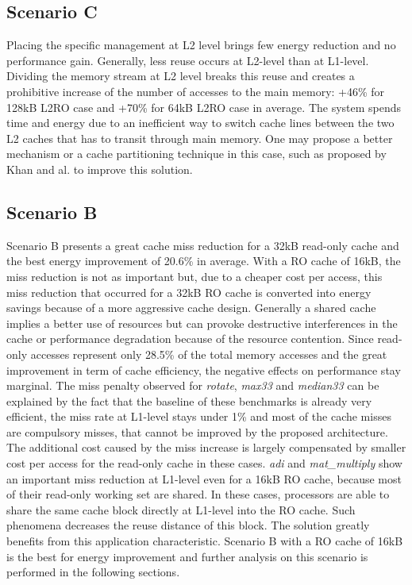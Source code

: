 \documentclass[sigconf]{acmart}
\begin{document}
\subsection{Scenario C}

Placing the specific management at L2 level brings few energy reduction and no performance gain. Generally, less reuse occurs at L2-level than at L1-level. Dividing the memory stream at L2 level breaks this reuse and creates a prohibitive increase of the number of accesses to the main memory: +46\% for 128kB L2RO case and +70\% for 64kB L2RO case in average. The system spends time and energy due to an inefficient way to switch cache lines between the two L2 caches that has to transit through main memory. One may propose a better mechanism or a cache partitioning technique in this case, such as proposed by Khan and al.\cite{Khan:2014} to improve this solution. 

\subsection{Scenario B}

Scenario B presents a great cache miss reduction for a 32kB read-only
cache and the best energy improvement of 20.6\% in average. With a RO
cache of 16kB, the miss reduction is not as important but, due to a
cheaper cost per access, this miss reduction that occurred for a 32kB
RO cache is converted into energy savings because of a more aggressive
cache design.
Generally a shared cache implies a better use of resources but
can provoke destructive interferences in the cache or performance
degradation because of the resource contention. Since read-only
accesses represent only 28.5\% of the total memory accesses and the
great improvement in term of cache efficiency, the negative effects on
performance stay marginal. The miss penalty observed for \textit{rotate},
\textit{max33} and \textit{median33} can be explained by the fact that
the baseline of these benchmarks is already very efficient, the miss
rate at L1-level stays under 1\% and most of the cache misses
are compulsory misses, that cannot be improved by the proposed architecture. The additional cost caused by the miss increase is
largely compensated by smaller cost per access for the read-only cache
in these cases. \textit{adi} and \textit{mat\_multiply} show an
important miss reduction at L1-level even for a 16kB RO cache, because
most of their read-only working set are shared. In these cases,
processors are able to share the same cache block directly at L1-level
into the RO cache. Such phenomena decreases the reuse distance of this
block. The solution greatly benefits from this
application characteristic. Scenario B with a RO cache of 16kB is
the best for energy improvement and further analysis on this scenario
is performed in the following sections.
\end{document}
